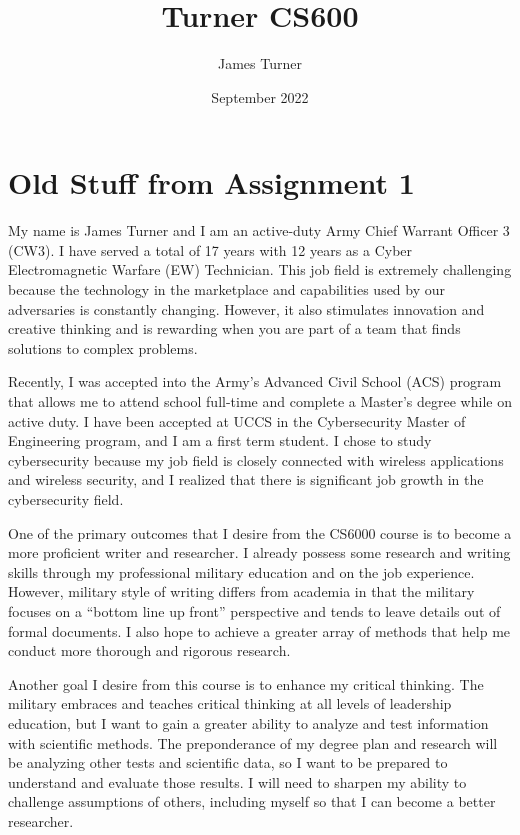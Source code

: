 \graphicspath{ {./images/} }

\title{Turner  CS600}
\author{James Turner}
\date{September 2022}

%

\maketitle
\newpage
\section{Old Stuff from Assignment 1}
My name is James Turner and I am an active-duty Army Chief Warrant Officer 3 (CW3).  I have served a total of 17 years with 12 years as a Cyber Electromagnetic Warfare (EW) Technician.  This job field is extremely challenging because the technology in the marketplace and capabilities used by our adversaries is constantly changing.  However, it also stimulates innovation and creative thinking and is rewarding when you are part of a team that finds solutions to complex problems.

Recently, I was accepted into the Army’s Advanced Civil School (ACS) program that allows me to attend school full-time and complete a Master’s degree while on active duty.  I have been accepted at UCCS in the Cybersecurity Master of Engineering program, and I am a first term student.  I chose to study cybersecurity because my job field is closely connected with wireless applications and wireless security, and I realized that there is significant job growth in the cybersecurity field.

One of the primary outcomes that I desire from the CS6000 course is to become a more proficient writer and researcher.   I already possess some research and writing skills through my professional military education and on the job experience.  However, military style of writing differs from academia in that the military focuses on a “bottom line up front” perspective and tends to leave details out of formal documents.  I also hope to achieve a greater array of methods that help me conduct more thorough and rigorous research.

Another goal I desire from this course is to enhance my critical thinking.  The military embraces and teaches critical thinking at all levels of leadership education, but I want to gain a greater ability to analyze and test information with scientific methods.  The preponderance of my degree plan and research will be analyzing other tests and scientific data, so I want to be prepared to understand and evaluate those results.  I will need to sharpen my ability to challenge assumptions of others, including myself so that I can become a better researcher.

